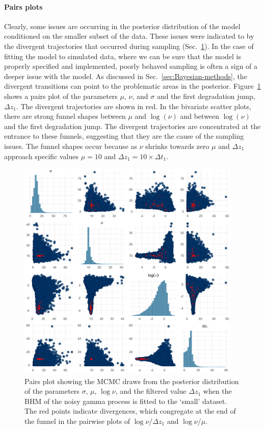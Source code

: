 \paragraph*{Pairs plots}
Clearly, some issues are occurring in the posterior distribution of the model conditioned on the smaller subset of the data. These issues were indicated to by the divergent trajectories that occurred during sampling (Sec.~\ref{fig:pairs}). In the case of fitting the model to simulated data, where we can be sure that the model is properly specified and implemented, poorly behaved sampling is often a sign of a deeper issue with the model. As discussed in Sec.~\ref{sec:Bayesian-methods}, the divergent transitions can point to the problematic areas in the posterior. Figure~\ref{fig:pairs} shows a pairs plot of the parameters $\mu$, $\nu$, and $\sigma$ and the first degradation jump, $\Delta z_1$. The divergent trajectories are shown in red. In the bivariate scatter plots, there are strong funnel shapes between $\mu$ and $\log(\nu)$ and between $\log(\nu)$ and the first degradation jump. The divergent trajectories are concentrated at the entrance to these funnels, suggesting that they are the cause of the sampling issues. The funnel shapes occur because as $\nu$ shrinks towards zero $\mu$ and $\Delta z_1$ approach specific values $\mu = 10$ and $\Delta z_1 = 10 \times \Delta t_1$.

\begin{figure}[tbp]
  \centering
  \includegraphics[width=0.95\textwidth]{./figures/ch-4/Small-data-pairs.png}
  \caption{Pairs plot showing the MCMC draws from the posterior distribution of the parameters $\sigma$, $\mu$, $\log\nu$, and the filtered value $\Delta z_1$ when the BHM of the noisy gamma process is fitted to the `small' dataset. The red points indicate divergences, which congregate at the end of the funnel in the pairwise plots of $\log\nu$/$\Delta z_1$ and $\log\nu$/$\mu$.}
  \label{fig:pairs}
\end{figure}

